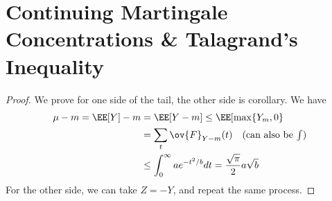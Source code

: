 \chapter{Continuing Martingale Concentrations \& Talagrand's Inequality}

\begin{proof}
We prove for one side of the tail, the other side is corollary. We have 
\begin{align*}
\mu - m = \EE[Y] - m &= \EE[Y-m] \leq \EE[\max\{Y_m, 0\} \\
&= \sum_t \ov{F}_{Y-m}(t) \quad \text{(can also be $\textstyle\int$)} \\
&\leq \int_0^\infty ae^{-t^2/b}dt = \frac{\sqrt{\pi}}{2} a\sqrt{b}
\end{align*}
For the other side, we can take $Z = -Y$, and repeat the same process.
\end{proof}

